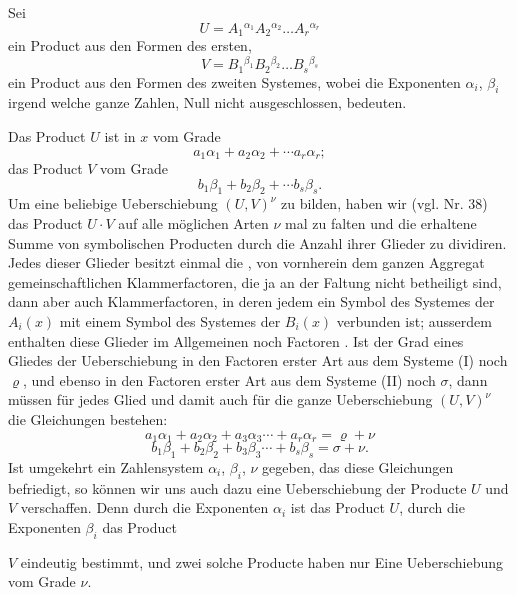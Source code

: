 \documentclass[11pt]{article}
\providecommand{\gesperrt}[1]{\textls[130]{#1}}
\providecommand{\weberpage}[1]{}
\providecommand{\weq}[2]{\begin{equation}\tag{#1}#2\end{equation}}
\begin{document}
Sei
\[
U = A_1{}^{\alpha_1} A_2{}^{\alpha_2} \ldots A_r{}^{\alpha_r}
\]
ein Product aus den Formen des ersten,
\[
V = B_1{}^{\beta_1} B_2{}^{\beta_2} \ldots B_s{}^{\beta_s}
\]
ein Product aus den Formen des zweiten Systemes, wobei die Exponenten $\alpha_i$, $\beta_i$ irgend welche ganze Zahlen, Null nicht ausgeschlossen, bedeuten.

Das Product $U$ ist in $x$ vom Grade
\[
a_1 \alpha_1 + a_2 \alpha_2 + \cdots a_r \alpha_r;
\]
das Product $V$ vom Grade
\[
b_1 \beta_1 + b_2 \beta_2 + \cdots b_s \beta_s.
\]
Um eine beliebige Ueberschiebung $(U, V)^{\nu}$ zu bilden, haben wir (vgl. Nr. 38) das Product $U \cdot V$ auf alle m\"oglichen Arten $\nu$ mal zu falten und die erhaltene Summe von symbolischen Producten durch die Anzahl ihrer Glieder zu dividiren. Jedes dieser Glieder besitzt einmal die \gesperrt{alten}, von vornherein dem ganzen Aggregat gemeinschaftlichen Klammerfactoren, die ja an der Faltung nicht betheiligt sind, dann aber auch \gesperrt{$\nu$ neue} Klammerfactoren, in deren jedem ein Symbol des Systemes der $A_i(x)$ mit einem Symbol des Systemes der $B_i(x)$ verbunden ist; ausserdem enthalten diese Glieder im Allgemeinen noch Factoren \gesperrt{erster Art}. Ist der Grad eines Gliedes der Ueberschiebung in den Factoren erster Art aus dem Systeme (I) noch $\varrho$, und ebenso in den Factoren erster Art aus dem Systeme (II) noch $\sigma$, dann m\"ussen f\"ur jedes Glied und damit auch f\"ur die ganze Ueberschiebung $(U, V)^{\nu}$ die Gleichungen bestehen:
\weq{1}{a_1 \alpha_1 + a_2 \alpha_2 + a_3 \alpha_3 \cdots + a_r \alpha_r = \varrho + \nu}
\weq{2}{b_1 \beta_1 + b_2 \beta_2 + b_3 \beta_3 \cdots + b_s \beta_s = \sigma + \nu.}
Ist umgekehrt ein Zahlensystem $\alpha_i$, $\beta_i$, $\nu$ gegeben, das diese Gleichungen befriedigt, so k\"onnen wir uns auch dazu eine Ueberschiebung der Producte $U$ und $V$ verschaffen. Denn durch die Exponenten $\alpha_i$ ist das Product $U$, durch die Exponenten $\beta_i$ das Product


\weberpage{223}
$V$ eindeutig bestimmt, und zwei solche Producte haben nur Eine Ueberschiebung vom Grade $\nu$.
\end{document}
